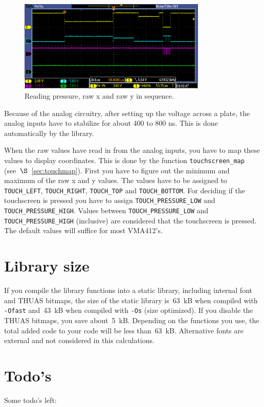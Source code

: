 \documentclass[12pt]{article}
\begin{document}
\begin{figure}[!ht]
\centering
\includegraphics[width=0.8\textwidth]{sample_pressure_x_y}
\caption{Reading pressure, raw x and\textbf{} raw y in sequence.}
\label{fig:26}
\end{figure}

Because of the analog circuitry, after setting up the voltage across a plate, the analog inputs have to stabilize for about 400 to 800 ns. This is done automatically by the library.

When the raw values have read in from the analog inputs, you have to map these values to display coordinates. This is done by the function \lstinline|touchscreen_map| (see~$\S$~\ref{sec:touchmap}). First you have to figure out the minimum and maximum of the raw x and y values. The values have to be assigned to \lstinline|TOUCH_LEFT|, \lstinline|TOUCH_RIGHT|, \lstinline|TOUCH_TOP| and \lstinline|TOUCH_BOTTOM|. For deciding if the touchscreen is pressed you have to assign \lstinline|TOUCH_PRESSURE_LOW| and \lstinline|TOUCH_PRESSURE_HIGH|. Values between \lstinline|TOUCH_PRESSURE_LOW| and \lstinline|TOUCH_PRESSURE_HIGH| (inclusive) are considered that the touchscreen is pressed. The default values will suffice for most VMA412's.


\section{Library size}
If you compile the library functions into a static library, including internal font and THUAS bitmaps, the size of the static library is~63~kB when compiled with \lstinline|-Ofast| and~43~kB when compiled with \lstinline|-Os| (size optimized). If you disable the THUAS bitmaps, you save about~5~kB. Depending on the functions you use, the total added code to your code will be less than~63~kB. Alternative fonts are external and not considered in this calculations. 

\section{Todo's}
Some todo's left:
\end{document}
